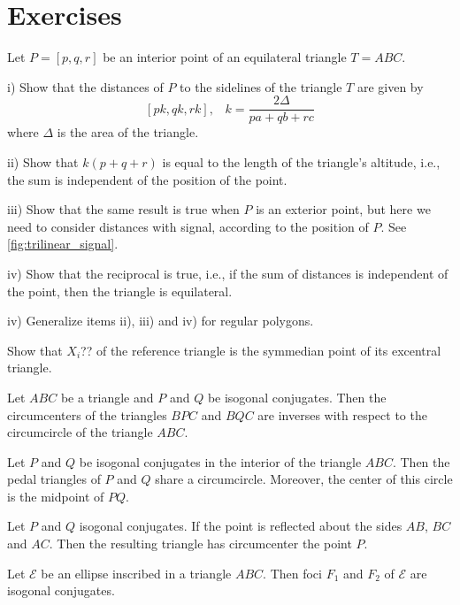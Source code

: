 
\section{Exercises}
\label{app:A-exercises}

\begin{exercise}\label{ex:1chap1}
Let $P=[p,q,r] $ be an interior point of an equilateral triangle $T=ABC$.

\noindent i) Show that the distances of $P$ to the sidelines of the triangle $T$ are given by
\[ [pk,qk,rk], \;\;\;k=\frac{2\Delta}{pa+qb+rc}\]
where $\Delta$ is the area of the triangle.

 \noindent ii)
 Show that  $k(p+q+r)$ is equal to the length of the triangle's altitude, i.e., the sum is independent of the position of the point.
 
 \noindent iii) Show that the same result is true when $P$ is an exterior point, but here we need to consider distances with signal, according to the position of $P$. See \cref{fig:trilinear_signal}.
 
 \noindent iv) Show that the reciprocal is true, i.e., if the sum of distances is independent of the point, then the triangle is equilateral.
 
 \noindent iv) Generalize items ii), iii) and iv)  for regular polygons.
 \end{exercise}
 
 \begin{exercise}\label{ex:2chap1} Show that $X_i$??  of the reference triangle    is the symmedian point of its excentral triangle.
 
  \end{exercise}
 
  \begin{exercise}\label{ex:3appA}
 Let $ABC$ be a  triangle and    $P$ and $Q$ be isogonal conjugates.  Then the circumcenters of the triangles $BPC$ and $BQC$ are inverses with respect to the circumcircle of the triangle $ABC$.
   \end{exercise}
  
   \begin{exercise}\label{ex:4appA}
   Let $P$ and $Q$ be isogonal conjugates in the interior of
the triangle $ABC$. Then the   pedal  triangles of $P$ and $Q$
 share a circumcircle. Moreover, the center of this circle is the midpoint
of $PQ$.
    \end{exercise}
   
      \begin{exercise}\label{ex:5app}
  Let $P $ and $Q$ isogonal conjugates.  If the point
is reflected about the sides
$AB$, $BC$ and $AC$.
  Then the resulting triangle has circumcenter the point $P$.
 
    \end{exercise}  \begin{exercise}\label{ex:6app}
  Let $\mathcal{E}$ be an ellipse inscribed in a triangle $ABC$. Then foci $F_1$ and $F_2$ of $\mathcal{E}$ are isogonal conjugates. 
 
    \end{exercise}
    
